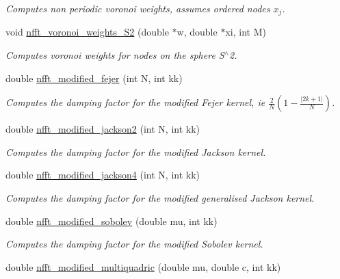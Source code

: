 \begin{CompactItemize}
\begin{CompactList}\small\item\em Computes non periodic voronoi weights, assumes ordered nodes $x_j$. \item\end{CompactList}\item 
\hypertarget{group__nfftutil_ga49}{
void \hyperlink{group__nfftutil_ga49}{nfft\_\-voronoi\_\-weights\_\-S2} (double $\ast$w, double $\ast$xi, int M)}
\label{group__nfftutil_ga49}

\begin{CompactList}\small\item\em Computes voronoi weights for nodes on the sphere S$^\wedge$2. \item\end{CompactList}\item 
double \hyperlink{group__nfftutil_ga50}{nfft\_\-modified\_\-fejer} (int N, int kk)
\begin{CompactList}\small\item\em Computes the damping factor for the modified Fejer kernel, ie $\frac{2}{N}\left(1-\frac{\left|2k+1\right|}{N}\right)$. \item\end{CompactList}\item 
\hypertarget{group__nfftutil_ga51}{
double \hyperlink{group__nfftutil_ga51}{nfft\_\-modified\_\-jackson2} (int N, int kk)}
\label{group__nfftutil_ga51}

\begin{CompactList}\small\item\em Computes the damping factor for the modified Jackson kernel. \item\end{CompactList}\item 
\hypertarget{group__nfftutil_ga52}{
double \hyperlink{group__nfftutil_ga52}{nfft\_\-modified\_\-jackson4} (int N, int kk)}
\label{group__nfftutil_ga52}

\begin{CompactList}\small\item\em Computes the damping factor for the modified generalised Jackson kernel. \item\end{CompactList}\item 
\hypertarget{group__nfftutil_ga53}{
double \hyperlink{group__nfftutil_ga53}{nfft\_\-modified\_\-sobolev} (double mu, int kk)}
\label{group__nfftutil_ga53}

\begin{CompactList}\small\item\em Computes the damping factor for the modified Sobolev kernel. \item\end{CompactList}\item 
\hypertarget{group__nfftutil_ga54}{
double \hyperlink{group__nfftutil_ga54}{nfft\_\-modified\_\-multiquadric} (double mu, double c, int kk)}
\label{group__nfftutil_ga54}


\end{CompactItemize}
